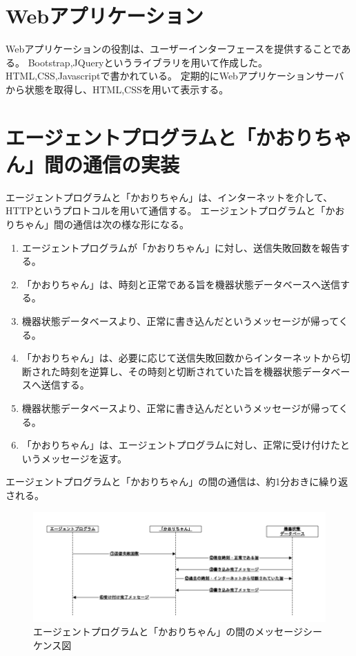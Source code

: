 \section{Webアプリケーション}
Webアプリケーションの役割は、ユーザーインターフェースを提供することである。
Bootstrap,JQueryというライブラリを用いて作成した。HTML,CSS,Javascriptで書かれている。
定期的にWebアプリケーションサーバから状態を取得し、HTML,CSSを用いて表示する。

\section{エージェントプログラムと「かおりちゃん」間の通信の実装}
エージェントプログラムと「かおりちゃん」は、インターネットを介して、HTTPというプロトコルを用いて通信する。
エージェントプログラムと「かおりちゃん」間の通信は次の様な形になる。
\begin{enumerate}
	\item エージェントプログラムが「かおりちゃん」に対し、送信失敗回数を報告する。
	\item 「かおりちゃん」は、時刻と正常である旨を機器状態データベースへ送信する。
	\item 機器状態データベースより、正常に書き込んだというメッセージが帰ってくる。
	\item 「かおりちゃん」は、必要に応じて送信失敗回数からインターネットから切断された時刻を逆算し、その時刻と切断されていた旨を機器状態データベースへ送信する。
	\item 機器状態データベースより、正常に書き込んだというメッセージが帰ってくる。
	\item 「かおりちゃん」は、エージェントプログラムに対し、正常に受け付けたというメッセージを返す。
\end{enumerate}
エージェントプログラムと「かおりちゃん」の間の通信は、約1分おきに繰り返される。
\begin{figure}[htbp]
\includegraphics[width=16cm]{images/seq1.png}
\caption{エージェントプログラムと「かおりちゃん」の間のメッセージシーケンス図}
\label{fig:blockdiagram}
\end{figure}

